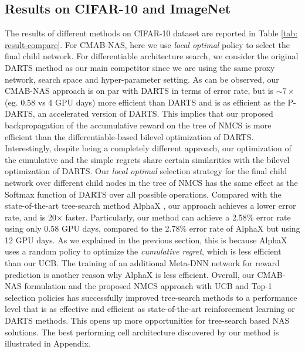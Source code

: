 \documentclass[conference]{IEEEtran}
\begin{document}
\subsection{Results on CIFAR-10 and ImageNet}\label{sec:experiment_cifar10}
The results of different methods on CIFAR-10 dataset are reported in Table \ref{tab: result-compare}. 
For CMAB-NAS, here we use \emph{local optimal} policy to select the final child network.
For differentiable architecture search, we consider the original DARTS \cite{liu2018darts} method as our main competitor since we are using the same proxy network, search space and hyper-parameter setting. As can be observed, our CMAB-NAS approach is on par with DARTS in terms of error rate, but is $\sim 7\times$ (eg. 0.58 vs 4 GPU days) more efficient than DARTS and is as efficient as the P-DARTS, an accelerated version of DARTS.
This implies that our proposed backpropagation of the accumulative reward on the tree of NMCS is more efficient than the differentiable-based bilevel optimization of DARTS.
Interestingly, despite being a completely different approach, our optimization of the cumulative and the simple regrets share certain similarities with the bilevel optimization of DARTS. Our \emph{local optimal}  selection strategy for the final child network over different child nodes in the tree of NMCS has the same effect as the Softmax function of DARTS over all possible operations.
Compared with the state-of-the-art tree-search method AlphaX \cite{wang2019alphax}, our approach achieves a lower error rate, and is 20$\times$ faster. Particularly, our method can achieve a 2.58\% error rate using only 0.58 GPU days, compared to the 2.78\% error rate of AlphaX but using 12 GPU days. 
As we explained in the previous section, this is because AlphaX uses a random policy to optimize the \emph{cumulative regret}, which is less efficient than our UCB.
The training of an additional Meta-DNN network for reward prediction is another reason why AlphaX is less efficient. 
Overall, our CMAB-NAS formulation and the proposed NMCS approach with UCB and Top-1 selection policies has successfully improved tree-search methods to a performance level that is as effective and efficient as state-of-the-art reinforcement learning or DARTS methods. 
This opens up more opportunities for tree-search based NAS solutions.
The best performing cell architecture discovered by our method is illustrated in Appendix.


\end{document}
